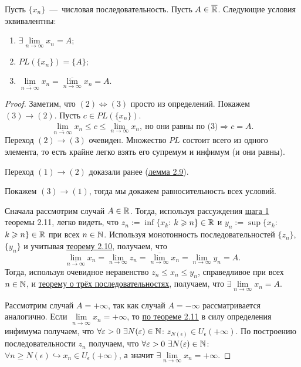 \newpage

\begin{theorem}
    Пусть $\{ x_{n} \}$~---~числовая последовательность. Пусть $A \in \overline{\mathbb{R}}$. Следующие условия эквивалентны:
    \begin{enumerate}
        \item $\exists \lim\limits_{n\to \infty} x_{n} = A;$
        \item $PL (\{ x_{n} \}) = \{ A \};$
        \item $ \lim\limits_{\overline{n\to \infty}} x_{n} = \overline{\lim\limits_{n\to \infty}} x_{n} = A.$
    \end{enumerate}
\end{theorem}
\begin{proof}
    Заметим, что $(2) \Leftrightarrow (3)$ просто из определений. Покажем $(3) \to (2)$. Пусть $c \in PL (\{ x_{n} \})$.
    $$ \lim\limits_{\overline{n\to \infty}} x_{n} \leq c \leq \overline{\lim\limits_{n\to \infty}} x_{n}, \  \text{но они равны по (3)} \Rightarrow c = A. $$ Переход $(2) \to (3)$ очевиден. Множество $PL$ состоит всего из одного элемента, то есть крайне легко взять его супремум и инфимум (и они равны).

    Переход $(1) \to (2)$ доказали ранее (\hyperlink{lemm2.9}{лемма 2.9}).

    Покажем $(3) \to (1)$, тогда мы докажем равносительность всех условий.

    Сначала рассмотрим случай $A \in \mathbb{R}$. Тогда, используя рассуждения \hyperlink{step1}{шага 1} теоремы 2.11, легко видеть, что $z_{n} := \inf \{ x_{k}$: $k \geqslant n\} \in \mathbb{R}$ и $y_{n} := \sup \{ x_{k}$: $k \geqslant n\} \in \mathbb{R}$ при всех $n \in \mathbb{N}$. Используя монотонность последовательностей $\{ z_{n} \}$, $\{ y_{n} \}$ и учитывая \hyperlink{thm2.10}{теорему 2.10}, получаем, что
    $$ \lim\limits_{\overline{n\to \infty}} x_{n} = \lim\limits_{n\to \infty} z_{n} = \overline{\lim\limits_{n\to \infty}} x_{n} = \lim\limits_{n\to \infty} y_{n} = A.$$
    Тогда, используя очевидное неравенство $z_{n} \leq x_{n} \leq y_{n}$, справедливое при всех $n \in \mathbb{N}$, и \hyperlink{thm2.4}{теорему о трёх последовательностях}, получаем, что $\exists \lim\limits_{n\to \infty} x_{n} = A$.
    
    Рассмотрим случай $A = +\infty$, так как случай $A = -\infty$ рассматривается аналогично. Если $\lim\limits_{\overline{n\to \infty}} x_{n} = +\infty$, то \hyperlink{thm2.11}{по теореме 2.11} в силу определения инфимума получаем, что $\forall \varepsilon > 0 \  \exists N (\varepsilon) \in \mathbb{N}$: $z_{N (\epsilon)} \in U_{\epsilon} (+ \infty)$. По построению последовательности $z_{n}$ получаем, что $\forall \varepsilon > 0 \  \exists N (\varepsilon) \in \mathbb{N}$: $\forall n \geq N (\epsilon) \hookrightarrow x_{n} \in U_{\epsilon} (+ \infty)$, а значит $\exists \lim\limits_{n\to \infty} x_{n} = +\infty$.
\end{proof}

